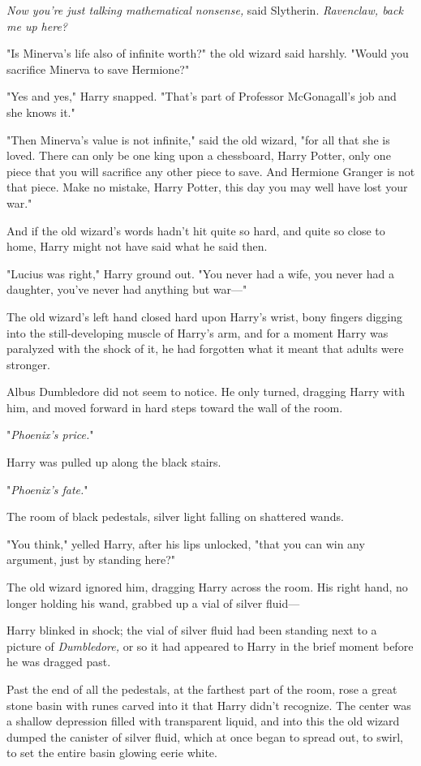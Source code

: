 \emph{Now you're just talking mathematical nonsense,} said Slytherin. 
\emph{Ravenclaw, back me up here?}

"Is Minerva's life also of infinite worth?" the old wizard said harshly. "Would 
you sacrifice Minerva to save Hermione?"

"Yes and yes," Harry snapped. "That's part of Professor McGonagall's job and 
she knows it."

"Then Minerva's value is not infinite," said the old wizard, "for all that she 
is loved. There can only be one king upon a chessboard, Harry Potter, only one 
piece that you will sacrifice any other piece to save. And Hermione Granger is 
not that piece. Make no mistake, Harry Potter, this day you may well have lost 
your war."

And if the old wizard's words hadn't hit quite so hard, and quite so close to 
home, Harry might not have said what he said then.

"Lucius was right," Harry ground out. "You never had a wife, you never had a 
daughter, you've never had anything but war---"

The old wizard's left hand closed hard upon Harry's wrist, bony fingers digging 
into the still-developing muscle of Harry's arm, and for a moment Harry was 
paralyzed with the shock of it, he had forgotten what it meant that adults were 
stronger.

Albus Dumbledore did not seem to notice. He only turned, dragging Harry with 
him, and moved forward in hard steps toward the wall of the room.

"\emph{Phoenix's price.}"

Harry was pulled up along the black stairs.

"\emph{Phoenix's fate.}"

The room of black pedestals, silver light falling on shattered wands.

"You think," yelled Harry, after his lips unlocked, "that you can win any 
argument, just by standing here?"

The old wizard ignored him, dragging Harry across the room. His right hand, no 
longer holding his wand, grabbed up a vial of silver fluid---

Harry blinked in shock; the vial of silver fluid had been standing next to a 
picture of \emph{Dumbledore,} or so it had appeared to Harry in the brief 
moment before he was dragged past.

Past the end of all the pedestals, at the farthest part of the room, rose a 
great stone basin with runes carved into it that Harry didn't recognize. The 
center was a shallow depression filled with transparent liquid, and into this 
the old wizard dumped the canister of silver fluid, which at once began to 
spread out, to swirl, to set the entire basin glowing eerie white.

